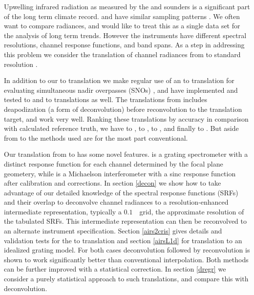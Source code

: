 
Upwelling infrared radiation as measured by the {\airs} \cite{airs1}
and {\cris} \cite{cris1,cris2} sounders is a significant part of the
long term climate record.  {\airs} and {\cris} have similar sampling
patterns \cite{git:acsamp}.  We often want to compare radiances, and
would like to treat this as a single data set for the analysis of
long term trends.  However the instruments have different spectral
resolutions, channel response functions, and band spans.  As a step
in addressing this problem we consider the translation of channel
radiances from {\airs} to standard resolution {\cris}.

In addition to our {\airs} to {\cris} translation we make regular
use of an {\iasi} to {\cris} translation for evaluating simultaneous
nadir overpasses (SNOs) \cite{sno1}, and have implemented and tested
{\iasi} to {\airs} and {\cris} to {\airs} translations as well.  The
translations from {\iasi} includes deapodization (a form of
deconvolution) before reconvolution to the translation target, and
work very well.  Ranking these translations by accuracy in
comparison with calculated reference truth, we have {\iasi} to
{\cris}, {\iasi} to {\airs}, {\airs} to {\cris}, and finally {\cris}
to {\airs} \cite{git:decon}.  But aside from {\airs} to {\cris} the
methods used are for the most part conventional.

Our translation from {\airs} to {\cris} has some novel features.
{\airs} is a grating spectrometer with a distinct response function
for each channel determined by the focal plane geometery, while
{\cris} is a Michaelson interferometer with a sinc response
function after calibration and corrections.  In section \ref{decon}
we show how to take advantage of our detailed knowledge of the
{\airs} spectral response functions (SRFs) and their overlap to
deconvolve channel radiances to a resolution-enhanced intermediate
representation, typically a $0.1$~\wn\ grid, the approximate
resolution of the tabulated {\airs} SRFs.  
This intermediate representation can then be reconvolved to an
alternate instrument specification.  Section \ref{airs2cris} gives
details and validation tests for the {\airs} to {\cris} translation
and section \ref{airsL1d} for translation to an idealized grating
model.  For both cases deconvolution followed by reconvolution is
shown to work significantly better than conventional interpolation.
Both methods can be further improved with a statistical correction.
In section \ref{dregr} we consider a purely statistical approach to
such translations, and compare this with deconvolution.

